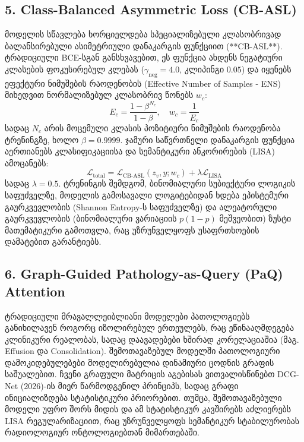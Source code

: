 \documentclass[12pt,a4paper,oneside]{report}
\begin{document}
\subsection{5. Class-Balanced Asymmetric Loss (CB-ASL)}
მოდელის სწავლება ხორციელდება სპეციალიზებული კლასობრივად ბალანსირებული ასიმეტრიული დანაკარგის ფუნქციით (**CB-ASL**). ტრადიციული BCE-სგან განსხვავებით, ეს ფუნქცია ახდენს ნეგატიური კლასების ფოკუსირებულ კლებას ($\gamma_{\text{neg}} = 4.0$, კლიპინგი $0.05$) და იყენებს ეფექტური ნიმუშების რაოდენობის (Effective Number of Samples - ENS) მიხედვით ნორმალიზებულ კლასობრივ წონებს $w_c$:
\begin{equation}
E_c = \frac{1 - \beta^{N_c}}{1 - \beta}, \quad w_c = \frac{1}{E_c}
\end{equation}
სადაც $N_c$ არის მოცემული კლასის პოზიტიური ნიმუშების რაოდენობა ტრენინგზე, ხოლო $\beta = 0.9999$. ჯამური საწვრთნელი დანაკარგის ფუნქცია აერთიანებს კლასიფიკაციისა და სემანტიკური ანკორირების (LISA) ამოცანებს:
\begin{equation}
\mathcal{L}_{\text{total}} = \mathcal{L}_{\text{CB-ASL}}(z_v, y; w_c) + \lambda \mathcal{L}_{\text{LISA}}
\end{equation}
სადაც $\lambda = 0.5$. ტრენინგის შემდგომ, ბინომიალური სუბიექტური ლოგიკის საფუძველზე, მოდელის გამოსავალი ლოგიტებიდან ხდება ეპისტემური გაურკვევლობის (Shannon Entropy-ს საფუძველზე) და ალეატორული გაურკვევლობის (ბინომიალური ვარიაციის $p(1-p)$ მეშვეობით) ზუსტი მათემატიკური გამოთვლა, რაც უზრუნველყოფს უსაფრთხოების დამატებით გარანტიებს.

\subsection{6. Graph-Guided Pathology-as-Query (PaQ) Attention}
ტრადიციული მრავალლეიბლიანი მოდელები პათოლოგიებს განიხილავენ როგორც იზოლირებულ ერთეულებს, რაც ეწინააღმდეგება კლინიკური რეალობას, სადაც დაავადებები ხშირად კორელაციაშია (მაგ. Effusion და Consolidation). შემოთავაზებულ მოდელში პათოლოგიური დამოკიდებულებები მოდელირებულია დინამიური ცოდნის გრაფის საშუალებით. ჩვენი გრაფული მატრიცის აგებისას ვითვალისწინებთ DCG-Net (2026)-ის მიერ წარმოდგენილ პრინციპს, სადაც გრაფი ინიციალიზდება სტატისტიკური პრიორებით. თუმცა, შემოთავაზებული მოდელი უფრო შორს მიდის და ამ სტატისტიკურ კავშირებს აძლიერებს LISA რეგულარიზაციით, რაც უზრუნველყოფს სემანტიკურ სტაბილურობას რადიოლოგიურ ონტოლოგიებთან მიმართებაში. 
\end{document}
